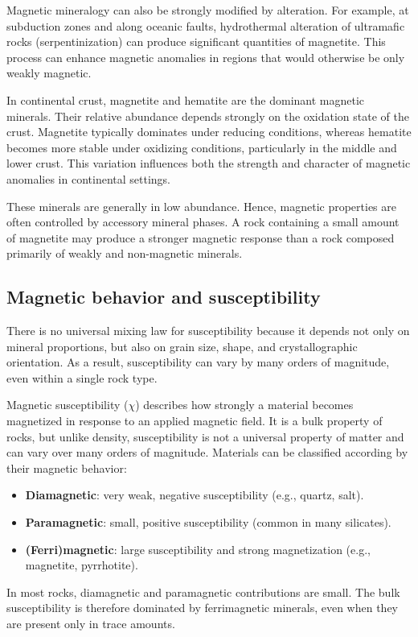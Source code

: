 Magnetic mineralogy can also be strongly modified by alteration. For example, at subduction zones and along oceanic faults, hydrothermal alteration of ultramafic rocks (serpentinization) can produce significant quantities of magnetite. This process can enhance magnetic anomalies in regions that would otherwise be only weakly magnetic.

In continental crust, magnetite and hematite are the dominant magnetic minerals. Their relative abundance depends strongly on the oxidation state of the crust. Magnetite typically dominates under reducing conditions, whereas hematite becomes more stable under oxidizing conditions, particularly in the middle and lower crust. This variation influences both the strength and character of magnetic anomalies in continental settings.

These minerals are generally in low abundance.  Hence, magnetic properties are often controlled by accessory mineral phases. A rock containing a small amount of magnetite may produce a stronger magnetic response than a rock composed primarily of weakly and non-magnetic minerals.

\subsection{Magnetic behavior and susceptibility}

There is no universal mixing law for susceptibility because it depends not only on mineral proportions, but also on grain size, shape, and crystallographic orientation. As a result, susceptibility can vary by many orders of magnitude, even within a single rock type.

Magnetic susceptibility ($\chi$) describes how strongly a material becomes magnetized in response to an applied magnetic field.  It is a bulk property of rocks, but unlike density, susceptibility is not a universal property of matter and can vary over many orders of magnitude.  Materials can be classified according by their magnetic behavior:
\begin{itemize}
    \item \textbf{Diamagnetic}: very weak, negative susceptibility (e.g., quartz, salt).
    \item \textbf{Paramagnetic}: small, positive susceptibility (common in many silicates).
    \item \textbf{(Ferri)magnetic}: large susceptibility and strong magnetization (e.g., magnetite, pyrrhotite).
\end{itemize}
In most rocks, diamagnetic and paramagnetic contributions are small. The bulk susceptibility is therefore dominated by ferrimagnetic minerals, even when they are present only in trace amounts.

